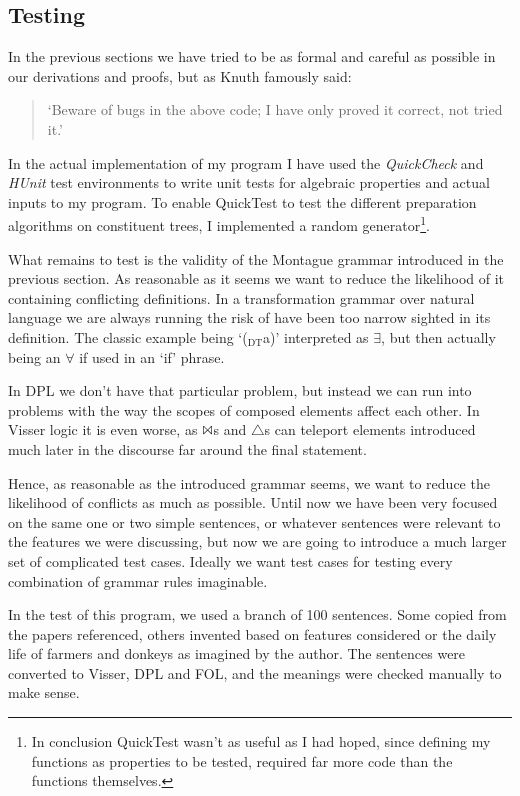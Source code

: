 \documentclass[12pt]{article}
\begin{document}
\subsection{Testing}
In the previous sections we have tried to be as formal and careful as possible in our derivations and proofs, but as Knuth famously said:

\begin{quotation}
`Beware of bugs in the above code; I have only proved it correct, not tried it.'
\end{quotation}

In the actual implementation of my program I have used the \emph{QuickCheck} and \emph{HUnit} test environments to write unit tests for algebraic properties and actual inputs to my program. To enable QuickTest to test the different preparation algorithms on constituent trees, I implemented a random generator\footnote{In conclusion QuickTest wasn't as useful as I had hoped, since defining my functions as properties to be tested, required far more code than the functions themselves.}.

What remains to test is the validity of the Montague grammar introduced in the previous section. As reasonable as it seems we want to reduce the likelihood of it containing conflicting definitions. In a transformation grammar over natural language we are always running the risk of have been too narrow sighted in its definition. The classic example being `($_\text{DT}$a)' interpreted as $\exists$, but then actually being an $\forall$ if used in an `if' phrase.

In DPL we don't have that particular problem, but instead we can run into problems with the way the scopes of composed elements affect each other. In Visser logic it is even worse, as $\Bowtie$s and $\triangle$s can teleport elements introduced much later in the discourse far around the final statement.

Hence, as reasonable as the introduced grammar seems, we want to reduce the likelihood of conflicts as much as possible. Until now we have been very focused on the same one or two simple sentences, or whatever sentences were relevant to the features we were discussing, but now we are going to introduce a much larger set of complicated test cases. Ideally we want test cases for testing every combination of grammar rules imaginable.

In the test of this program, we used a branch of 100 sentences. Some copied from the papers referenced, others invented based on features considered or the daily life of farmers and donkeys as imagined by the author. The sentences were converted to Visser, DPL and FOL, and the meanings were checked manually to make sense.
\end{document}
